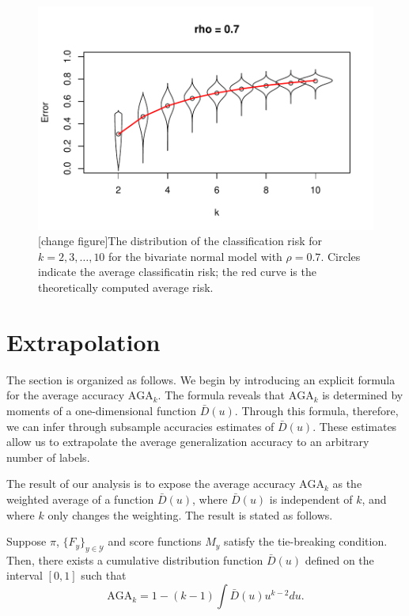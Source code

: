 \documentclass[twoside,11pt]{article}
\begin{document}
\begin{figure}[h]
\centering
\includegraphics[scale = 0.7, clip = true, trim = 0 0 0 0.5in]{illus_err_0_7.pdf}

\caption{[change figure]The distribution of the classification risk for $k = 2,3,\hdots, 10$ for the bivariate normal model with $\rho = 0.7$.
Circles indicate the average classificatin risk; the red curve is the theoretically computed average risk.}\label{fig:toy2}
\end{figure}
\section{Extrapolation}

The section is organized as follows.  We begin by introducing an explicit formula for the average accuracy $\text{AGA}_{k}$.  The formula reveals that $\text{AGA}_{k}$ is determined by moments of a one-dimensional function $\bar{D}(u)$.
Through this formula, therefore, we can infer through subsample accuracies 
estimates of $\bar{D}(u)$. 
These estimates allow us to extrapolate the average generalization
accuracy to an arbitrary number of labels.

The result of our analysis is to expose the average accuracy
$\text{AGA}_{k}$ as the weighted average of a function
$\bar{D}(u)$, where $\bar{D}(u)$ is independent of $k$, and where $k$
only changes the weighting.  The result is stated as follows.

\begin{theorem}\label{theorem:avrisk_identity}
Suppose $\pi$, $\{F_y\}_{y \in \mathcal{Y}}$ and score functions $M_y$ satisfy the tie-breaking condition.  Then, there exists a cumulative distribution function $\bar{D}(u)$ defined on the interval $[0,1]$ such that
\begin{equation}\label{eq:avrisk_identity}
\text{AGA}_{k} = 1 - (k-1) \int \bar{D}(u) u^{k-2} du.
\end{equation}
\end{theorem}
\end{document}
